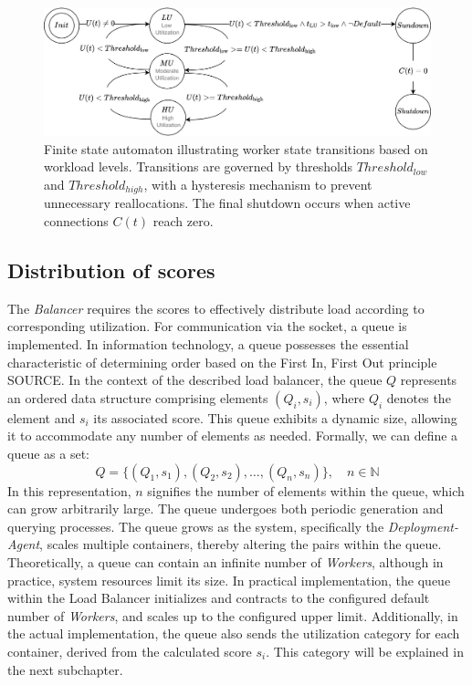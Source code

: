 \documentclass[twocolumn]{webofc}
\begin{document}
\begin{figure}[htbp]
\centering
\includegraphics[width=\textwidth]{utilizations.drawio.png}
\caption{Finite state automaton illustrating worker state transitions based on workload levels. Transitions are governed by thresholds $Threshold_{low}$ and $Threshold_{high}$, with a hysteresis mechanism to prevent unnecessary reallocations. The final shutdown occurs when active connections $C(t)$ reach zero.}
\label{fig:automat}
\end{figure}

\subsection{Distribution of scores}
The \textit{Balancer} requires the scores to effectively distribute load according to corresponding utilization. For communication via the socket, a queue is implemented. In information technology, a queue possesses the essential characteristic of determining order based on the First In, First Out principle {\color{red} SOURCE}. In the context of the described load balancer, the queue \( Q \) represents an ordered data structure comprising elements \( (Q_i, s_i) \), where \( Q_i \) denotes the element and \( s_i \) its associated score. This queue exhibits a dynamic size, allowing it to accommodate any number of elements as needed. Formally, we can define a queue as a set:
$$Q = \{ (Q_1, s_1), (Q_2, s_2), \dots, (Q_n, s_n) \}, \quad n \in \mathbb{N}$$
In this representation, \( n \) signifies the number of elements within the queue, which can grow arbitrarily large. The queue undergoes both periodic generation and querying processes. The queue grows as the system, specifically the \textit{Deployment-Agent}, scales multiple containers, thereby altering the pairs within the queue. Theoretically, a queue can contain an infinite number of \textit{Workers}, although in practice, system resources limit its size. In practical implementation, the queue within the Load Balancer initializes and contracts to the configured default number of \textit{Workers}, and scales up to the configured upper limit. Additionally, in the actual implementation, the queue also sends the utilization category for each container, derived from the calculated score \( s_i \). This category will be explained in the next subchapter.
\end{document}

